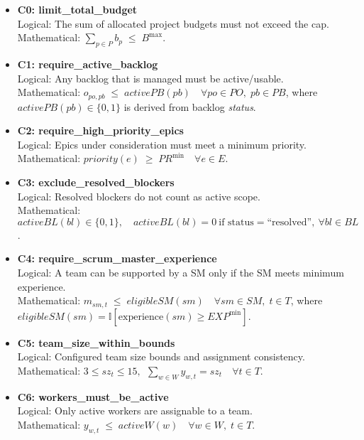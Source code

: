 \documentclass[11pt,a4paper]{article}
\begin{document}
\begin{itemize}[leftmargin=2em]

  \item \textbf{C0: limit\_total\_budget} \\
  Logical: The sum of allocated project budgets must not exceed the cap. \\
  Mathematical: $\displaystyle \sum_{p\in P} b_p \;\le\; B^{\max}$.

  \item \textbf{C1: require\_active\_backlog} \\
  Logical: Any backlog that is managed must be active/usable. \\
  Mathematical: $\displaystyle o_{po,pb} \;\le\; activePB(pb)\quad \forall po\in PO,\; pb\in PB$, where $activePB(pb)\in\{0,1\}$ is derived from backlog \emph{status}.

  \item \textbf{C2: require\_high\_priority\_epics} \\
  Logical: Epics under consideration must meet a minimum priority. \\
  Mathematical: $\displaystyle priority(e)\;\ge\; PR^{\min}\quad \forall e\in E$.

  \item \textbf{C3: exclude\_resolved\_blockers} \\
  Logical: Resolved blockers do not count as active scope. \\
  Mathematical: $\displaystyle activeBL(bl)\in\{0,1\},\quad activeBL(bl)=0\ \text{if status}=\text{``resolved''},\ \forall bl\in BL$.

  \item \textbf{C4: require\_scrum\_master\_experience} \\
  Logical: A team can be supported by a SM only if the SM meets minimum experience. \\
  Mathematical: $\displaystyle m_{sm,t} \;\le\; eligibleSM(sm)\quad \forall sm\in SM,\; t\in T$, where $eligibleSM(sm)=\mathbb{I}[\text{experience}(sm)\ge EXP^{\min}]$.

  \item \textbf{C5: team\_size\_within\_bounds} \\
  Logical: Configured team size bounds and assignment consistency. \\
  Mathematical: $\displaystyle 3 \le sz_t \le 15,\ \ \sum_{w\in W} y_{w,t} = sz_t \quad \forall t\in T$.

  \item \textbf{C6: workers\_must\_be\_active} \\
  Logical: Only active workers are assignable to a team. \\
  Mathematical: $\displaystyle y_{w,t} \;\le\; activeW(w)\quad \forall w\in W,\; t\in T$.


\end{itemize}
\end{document}
